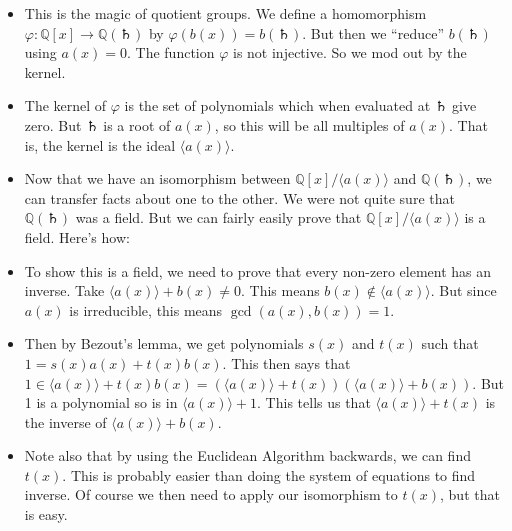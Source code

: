 \documentclass[12pt]{article}
\def\a{\Saturn}
\theoremstyle{plain}
\theoremstyle{definition}
\theoremstyle{remark}
\def\Q{\mathbb Q}
\begin{document}
\begin{itemize}
\item This is the magic of quotient groups.  We define a homomorphism $\varphi:\Q[x] \to \Q(\a)$ by $\varphi(b(x)) = b(\a)$.  But then we ``reduce'' $b(\a)$ using $a(x) = 0$.  The function $\varphi$ is not injective.  So we mod out by the kernel. 

\item The kernel of $\varphi$ is the set of polynomials which when evaluated at $\a$ give zero.  But $\a$ is a root of $a(x)$, so this will be all multiples of $a(x)$.  That is, the kernel is the ideal $\langle a(x) \rangle$.


\item Now that we have an isomorphism between $\Q[x]/\langle a(x)\rangle$ and $\Q(\a)$, we can transfer facts about one to the other.  We were not quite sure that $\Q(\a)$ was a field.  But we can fairly easily prove that $\Q[x]/\langle a(x)\rangle$ is a field.  Here's how:

\item To show this is a field, we need to prove that every non-zero element has an inverse.  Take $\langle a(x)\rangle + b(x)\ne 0$.  This means $b(x) \notin \langle a(x)\rangle$.  But since $a(x)$ is irreducible, this means $\gcd(a(x), b(x)) = 1$.

\item Then by Bezout's lemma, we get polynomials $s(x)$ and $t(x)$ such that $1 = s(x)a(x) + t(x)b(x)$.  This then says that $1 \in \langle a(x)\rangle + t(x)b(x) = (\langle a(x)\rangle  + t(x))(\langle a(x)\rangle + b(x))$.  But 1 is a polynomial so is in $\langle a(x)\rangle + 1$.  This tells us that $\langle a(x) \rangle + t(x)$  is the inverse of $\langle a(x)\rangle + b(x)$.  

\item Note also that by using the Euclidean Algorithm backwards, we can find $t(x)$.  This is probably easier than doing the system of equations to find inverse.  Of course we then need to apply our isomorphism to $t(x)$, but that is easy.

\end{itemize}

\end{document}
